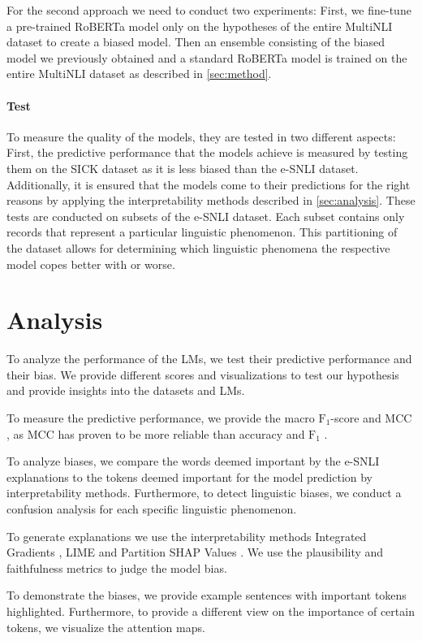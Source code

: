 \documentclass[12pt,a4paper]{article}
\begin{document}
For the second approach we need to conduct two experiments: First, we fine-tune a pre-trained \ac{RoBERTa} model only on the hypotheses of the entire \ac{MultiNLI} dataset to create a biased model. Then an ensemble consisting of the biased model we previously obtained and a standard \ac{RoBERTa} model is trained on the entire \ac{MultiNLI} dataset as described in \autoref{sec:method}.

\paragraph{Test} To measure the quality of the models, they are tested in two different aspects: First, the predictive performance that the models achieve is measured by testing them on the SICK dataset as it is less biased than the e-SNLI dataset. Additionally, it is ensured that the models come to their predictions for the right reasons by applying the interpretability methods described in \autoref{sec:analysis}. These tests are conducted on subsets of the e-SNLI dataset. Each subset contains only records that represent a particular linguistic phenomenon. This partitioning of the dataset allows for determining which linguistic phenomena the respective model copes better with or worse.

\section{Analysis} \label{sec:analysis}


To analyze the performance of the \acp{LM}, we test their predictive performance and their bias. We provide different scores and visualizations to test our hypothesis and provide insights into the datasets and \acp{LM}.

To measure the predictive performance, we provide the macro $\text{F}_1$-score \parencite{macrof1} and \ac{MCC} \parencite{mcc}, as \ac{MCC} has proven to be more reliable than accuracy and $\text{F}_1$ \parencite{mccGood}.

To analyze biases, we compare the words deemed important by the \ac{e-SNLI} explanations to the tokens deemed important for the model prediction by interpretability methods. Furthermore, to detect linguistic biases, we conduct a confusion analysis for each specific linguistic phenomenon.

To generate explanations we use the interpretability methods Integrated Gradients \parencite{integratedgradients}, \ac{LIME} \parencite{lime} and Partition SHAP Values \parencite{shap}. We use the plausibility and faithfulness \parencite{ferret} metrics to judge the model bias.

To demonstrate the biases, we provide example sentences with important tokens highlighted. Furthermore, to provide a different view on the importance of certain tokens, we visualize the attention maps.

\printbibliography{}
\end{document}
